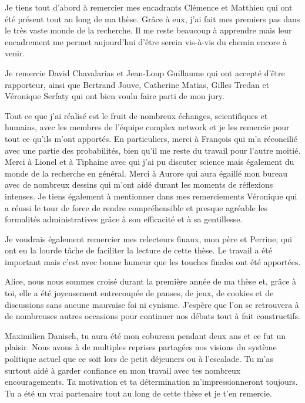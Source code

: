 \begin{acknowledgements}


Je tiens tout d'abord à remercier mes encadrants Clémence et Matthieu qui ont été présent tout au long de ma thèse.
Grâce à eux, j'ai fait mes premiers pas dans le très vaste monde de la recherche.
Il me reste beaucoup à apprendre mais leur encadrement me permet aujourd'hui d'être serein vis-à-vis du chemin encore à venir.

\medskip

Je remercie David Chavalarias et Jean-Loup Guillaume qui ont accepté d'être rapporteur, ainsi que Bertrand Jouve, Catherine Matias, Gilles Tredan et Véronique Serfaty qui ont bien voulu faire parti de mon jury.

\medskip

Tout ce que j'ai réalisé est le fruit de nombreux échanges, scientifiques et humains, avec les membres de l'équipe complex network et je les remercie pour tout ce qu'ils m'ont apportés.
En particuliers, merci à François qui m'a réconcilié avec une partie des probabilités, bien qu'il me reste du travail pour l'autre moitié.
Merci à Lionel et à Tiphaine avec qui j'ai pu discuter science mais également du monde de la recherche en général.
Merci à Aurore qui aura égaillé mon bureau avec de nombreux dessins qui m'ont aidé durant les moments de réflexions intenses.
Je tiens également à mentionner dans mes remerciements Véronique qui a réussi le tour de force de rendre compréhensible et presque agréable les formalités administratives grâce à son efficacité et à sa gentillesse.

\medskip

Je voudrais également remercier mes relecteurs finaux, mon père et Perrine, qui ont eu la lourde tâche de faciliter la lecture de cette thèse.
Le travail a été important mais c'est avec bonne humeur que les touches finales ont été apportées.

\medskip

Alice, nous nous sommes croisé durant la première année de ma thèse et, grâce à toi, elle a été joyeusement entrecoupée de pauses, de jeux, de cookies et de discussions sans aucune mauvaise foi ni cynisme.
J'espère que l'on se retrouvera à de nombreuses autres occasions pour continuer nos débats tout à fait constructifs.

\medskip

Maximilien Danisch, tu aura été mon cobureau pendant deux ans et ce fut un plaisir.
Nous avons à de multiples reprises partagées nos visions du système politique actuel que ce soit lors de petit déjeuners ou à l'escalade.
Tu m'as surtout aidé à garder confiance en mon travail avec tes nombreux encouragements.
Ta motivation et ta détermination m'impressionneront toujours.
Tu a été un vrai partenaire tout au long de cette thèse et je t'en remercie.


\end{acknowledgements}
